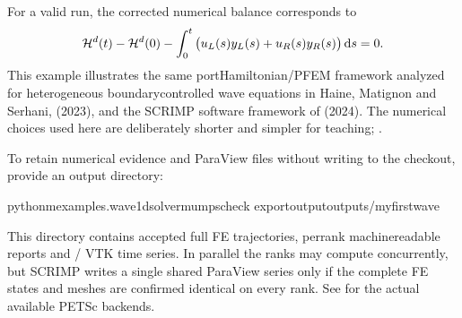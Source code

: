 \documentclass[letterpaper,10pt,english]{sphinxmanual}
\begin{document}
\sphinxAtStartPar
For a valid run, the corrected numerical balance corresponds to
\begin{equation*}
\begin{split}\mathcal{H}^d(t)-\mathcal{H}^d(0)
- \int_0^t \big(u_L(s)y_L(s)+u_R(s)y_R(s)\big)\,{\rm d}s
= 0.\end{split}
\end{equation*}
\sphinxAtStartPar
This example illustrates the same port\sphinxhyphen{}Hamiltonian/PFEM framework
analyzed for heterogeneous boundary\sphinxhyphen{}controlled wave equations in
Haine, Matignon and Serhani,
 (2023), and the SCRIMP
software framework of
 (2024).
The numerical choices used here are deliberately shorter and
simpler for teaching; .

\sphinxAtStartPar
To retain numerical evidence and ParaView files without writing to
the checkout, provide an output directory:

\begin{sphinxVerbatim}[commandchars=\\\{\}]
python\PYGZhy{}mexamples.wave\PYGZus{}1d\PYGZhy{}\PYGZhy{}solvermumps\PYGZhy{}\PYGZhy{}check
\PYGZhy{}\PYGZhy{}export\PYGZhy{}\PYGZhy{}outputoutputs/my\PYGZus{}first\PYGZus{}wave
\end{sphinxVerbatim}

\sphinxAtStartPar
This directory contains accepted full FE trajectories, per\sphinxhyphen{}rank
machine\sphinxhyphen{}readable reports and / VTK time series.
In parallel the ranks may compute concurrently, but SCRIMP
writes a single shared ParaView series only if the complete
FE states and meshes are confirmed identical on every rank.
See {\hyperref[\detokenize{install::doc}]{}} for the actual available PETSc backends.
\end{document}
